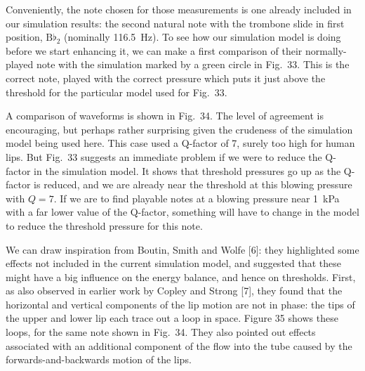   Conveniently, the note chosen for those measurements is one already included 
  in our simulation results: the second natural note with the trombone slide in 
  first position, $\mathrm{B}\flat_2$ (nominally 116.5~Hz). To see how our 
  simulation model is doing before we start enhancing it, we can make a first 
  comparison of their normally-played note with the simulation marked by a 
  green circle in Fig.\ 33. This is the correct note, played with the correct 
  pressure which puts it just above the threshold for the particular model used 
  for Fig.\ 33. 

  A comparison of waveforms is shown in Fig.\ 34. The level of agreement is 
  encouraging, but perhaps rather surprising given the crudeness of the 
  simulation model being used here. This case used a Q-factor of 7, surely too 
  high for human lips. But Fig.\ 33 suggests an immediate problem if we were to 
  reduce the Q-factor in the simulation model. It shows that threshold 
  pressures go up as the Q-factor is reduced, and we are already near the 
  threshold at this blowing pressure with $Q=7$. If we are to find playable 
  notes at a blowing pressure near 1~kPa with a far lower value of the 
  Q-factor, something will have to change in the model to reduce the threshold 
  pressure for this note. 


  We can draw inspiration from Boutin, Smith and Wolfe [6]: they highlighted 
  some effects not included in the current simulation model, and suggested that 
  these might have a big influence on the energy balance, and hence on 
  thresholds. First, as also observed in earlier work by Copley and Strong [7], 
  they found that the horizontal and vertical components of the lip motion are 
  not in phase: the tips of the upper and lower lip each trace out a loop in 
  space. Figure 35 shows these loops, for the same note shown in Fig.\ 34. They 
  also pointed out effects associated with an additional component of the flow 
  into the tube caused by the forwards-and-backwards motion of the lips. 

